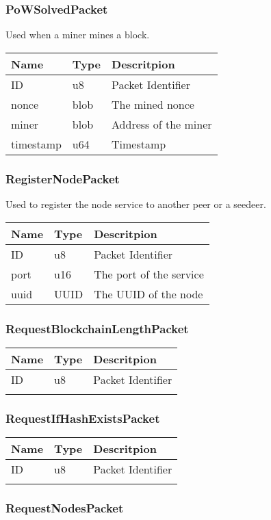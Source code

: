 \documentclass[../documentation.tex]{subfiles}
\begin{document}
\newcommand{\tline}{
    \\ \hline
}

\newcommand{\packettabular}[1]{
    \bgroup{}
    \def\arraystretch{1.25}
    \begin{center}
        \begin{tabular}{|l|l|l|}
            \hline
            \textbf{Name} & \textbf{Type} & \textbf{Descritpion}
            \tline
            ID & u8 & Packet Identifier
            \tline
            #1
            \tline
        \end{tabular}
    \end{center}
    \egroup{}
}

\subsubsection{PoWSolvedPacket}

Used when a miner mines a block.

\packettabular{
    nonce & blob & The mined nonce
    \tline
    miner & blob & Address of the miner
    \tline
    timestamp & u64 & Timestamp
}

\subsubsection{RegisterNodePacket}

Used to register the node service to another peer or a seedeer.

\packettabular{
    port & u16 & The port of the service
    \tline
    uuid & UUID & The UUID of the node
}

\subsubsection{RequestBlockchainLengthPacket}

\packettabular{

}

\subsubsection{RequestIfHashExistsPacket}

\packettabular{

}

\subsubsection{RequestNodesPacket}
\end{document}
